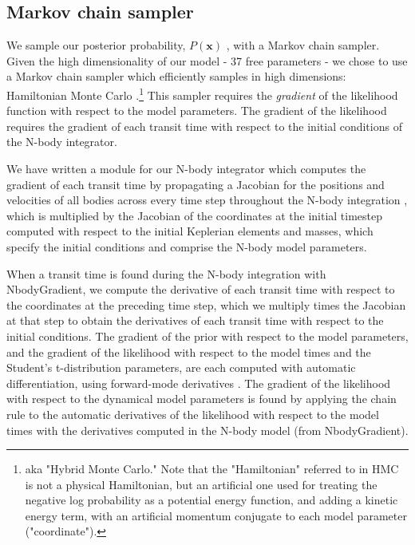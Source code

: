 \documentclass[fleqn,usenatbib]{mnras} %
\begin{document}
\subsection{Markov chain sampler}

We sample our posterior probability, $P(\mathbf{x})$ ,
with a Markov chain sampler.
Given the high dimensionality of our model - 37 free parameters - we chose to use
a Markov chain sampler which efficiently samples in high dimensions:  Hamiltonian
Monte Carlo \citep[HMC; ][]{Duane1987,Neal2011,Betancourt2017,Monnahan2016}.\footnote{aka "Hybrid Monte Carlo." Note
that the "Hamiltonian" referred to in HMC is not a physical Hamiltonian, but an
artificial one used for treating the negative log probability as a potential
energy function, and adding a kinetic energy term, with an artificial momentum conjugate
to each model parameter ("coordinate").}  This
sampler requires the {\it gradient} of the likelihood function with respect to
the model parameters.  The gradient of the likelihood requires the gradient
of each transit time with respect to the initial conditions of the N-body
integrator.

We have written a module for our N-body integrator which computes the
gradient of each transit time by propagating a Jacobian for the positions
and velocities of all bodies across every time step throughout the N-body
integration \citep{Agol2020}, which is multiplied by the Jacobian of the coordinates at the initial timestep computed with respect to the initial Keplerian elements and masses, which specify the initial conditions and comprise the N-body model parameters.  

When a transit time is found during the N-body integration with \textsf{NbodyGradient}, we compute the derivative of each transit time with respect to 
the coordinates at the preceding time step, which we multiply times the Jacobian 
at that step to obtain the derivatives of each transit time with respect to the 
initial conditions. 
The gradient of the prior with respect to the model parameters, and the gradient of the likelihood with respect to the model times and the Student's t-distribution parameters, are each computed with automatic 
differentiation, using forward-mode derivatives  \citep{Revels2016}.  The gradient of the likelihood with
respect to the dynamical model parameters is found by applying the chain rule to the automatic derivatives of the likelihood with respect to the model times with the derivatives computed in the N-body model (from \textsf{NbodyGradient}).
\end{document}
